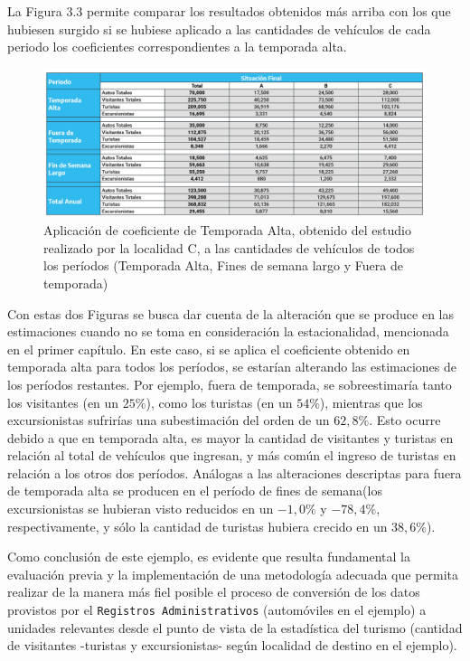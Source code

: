 \documentclass[
]{book}
\begin{document}
La Figura 3.3 permite comparar los resultados obtenidos más arriba con los que hubiesen surgido si se hubiese aplicado a las cantidades de vehículos de cada periodo los coeficientes correspondientes a la temporada alta.

\begin{figure}

{\centering \includegraphics[width=0.8\linewidth]{imagenes/figura5B} 

}

\caption{Aplicación de coeficiente de Temporada Alta, obtenido del estudio realizado por la localidad C, a las cantidades de vehículos de todos los períodos (Temporada Alta, Fines de semana largo y Fuera de temporada)}\label{fig:temporadaalta}
\end{figure}

\hfill\break
Con estas dos Figuras se busca dar cuenta de la alteración que se produce en las estimaciones cuando no se toma en consideración la estacionalidad, mencionada en el primer capítulo. En este caso, si se aplica el coeficiente obtenido en temporada alta para todos los períodos, se estarían alterando las estimaciones de los períodos restantes. Por ejemplo, fuera de temporada, se sobreestimaría tanto los visitantes (en un \(25\%\)), como los turistas (en un \(54\%\)), mientras que los excursionistas sufrirías una subestimación del orden de un \(62,8\%\). Esto ocurre debido a que en temporada alta, es mayor la cantidad de visitantes y turistas en relación al total de vehículos que ingresan, y más común el ingreso de turistas en relación a los otros dos períodos. Análogas a las alteraciones descriptas para fuera de temporada alta se producen en el período de fines de semana(los excursionistas se hubieran visto reducidos en un \(-1,0\%\) y \(-78,4\%\), respectivamente, y sólo la cantidad de turistas hubiera crecido en un \(38,6\%\)).

Como conclusión de este ejemplo, es evidente que resulta fundamental la evaluación previa y la implementación de una metodología adecuada que permita realizar de la manera más fiel posible el proceso de conversión de los datos provistos por el \texttt{Registros\ Administrativos} (automóviles en el ejemplo) a unidades relevantes desde el punto de vista de la estadística del turismo (cantidad de visitantes -turistas y excursionistas- según localidad de destino en el ejemplo).
\end{document}
